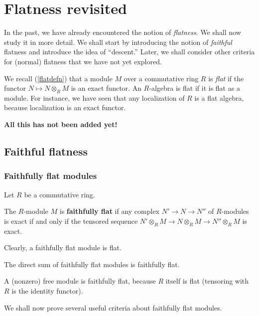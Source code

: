 \chapter{Flatness revisited}

In the past, we have already encountered the notion of \emph{flatness}. We
shall now study it in more detail.
We shall start by introducing the notion of \emph{faithful} flatness and
introduce the idea of ``descent.'' Later, we shall consider other criteria for
(normal) flatness that we have not yet explored.

We recall (\cref{flatdefn}) that a module $M$ over a commutative ring $R$ is
\emph{flat} if the functor $N \mapsto N \otimes_R M$ is an exact functor. An
$R$-algebra is flat if it is flat as a module. For instance, we have seen that
any localization of $R$ is a flat algebra, because localization is an exact
functor.


\textbf{All this has not been added yet!}

\section{Faithful flatness}



\subsection{Faithfully flat modules}
Let $R$ be a commutative ring.

\begin{definition} 
The $R$-module $M$ is \textbf{faithfully flat} if  any complex $N' \to N
\to N''$ of $R$-modules is exact if and only if the tensored sequence $N'
\otimes_R M \to N \otimes_R M \to N'' \otimes_R M$ is exact.
\end{definition} 

Clearly, a faithfully flat module is flat.


\begin{example} 
The direct sum of faithfully flat modules is faithfully flat.
\end{example} 
\begin{example} 
A (nonzero)  free module is faithfully flat, because $R$ itself is flat
(tensoring with $R$ is the identity functor).
\end{example} 

We shall now prove several useful criteria about faithfully flat modules.

